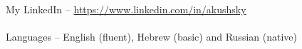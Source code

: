 \documentclass[11pt]{article}
\begin{document}
\noindent My LinkedIn -- \href{https://www.linkedin.com/in/akushsky}{https://www.linkedin.com/in/akushsky} \\ \\
\noindent Languages -- English (fluent), Hebrew (basic) and Russian (native)
\end{document}
